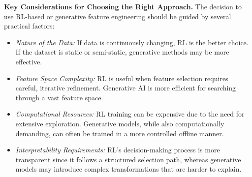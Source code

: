 \noindent
\textbf{Key Considerations for Choosing the Right Approach.}
The decision to use RL-based or generative feature engineering should be guided by several practical factors:
\begin{itemize}
    \item \emph{Nature of the Data:} If data is continuously changing, RL is the better choice. If the dataset is static or semi-static, generative methods may be more effective.
    \item \emph{Feature Space Complexity:} RL is useful when feature selection requires careful, iterative refinement. Generative AI is more efficient for searching through a vast feature space.
    \item \emph{Computational Resources:} RL training can be expensive due to the need for extensive exploration. Generative models, while also computationally demanding, can often be trained in a more controlled offline manner.
    \item \emph{Interpretability Requirements:} RL’s decision-making process is more transparent since it follows a structured selection path, whereas generative models may introduce complex transformations that are harder to explain.
\end{itemize}
